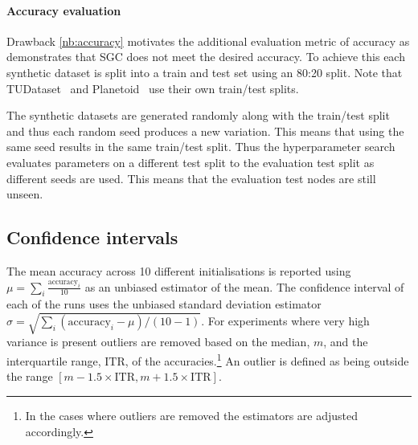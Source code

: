 
\paragraph{Accuracy evaluation}
Drawback \ref{nb:accuracy} motivates the additional evaluation metric of accuracy as  demonstrates that SGC does not meet the desired accuracy.
To achieve this each synthetic dataset is split into a train and test set using an 80:20 split.
Note that TUDataset~\cite{Morris+2020} and Planetoid~\cite{kipf2016semi} use their own train/test splits.

The synthetic datasets are generated randomly along with the train/test split and thus each random seed produces a new variation.
This means that using the same seed results in the same train/test split.
Thus the hyperparameter search evaluates parameters on a different test split to the evaluation test split as different seeds are used.
This means that the evaluation test nodes are still unseen.

\subsection{Confidence intervals}
\label{sec:reporting}
The mean accuracy across 10 different initialisations is reported using $\mu = \sum_i\frac{\text{accuracy}_i}{10}$ as an unbiased estimator of the mean.
The confidence interval of each of the runs uses the unbiased standard deviation estimator $\sigma = \sqrt{\sum_i(\text{accuracy}_i - \mu)/(10 - 1)}$.
For experiments where very high variance is present outliers are removed based on the median, $m$, and the interquartile range, $\text{ITR}$, of the accuracies.\footnote{In the cases where outliers are removed the estimators are adjusted accordingly.}
An outlier is defined as being outside the range $[m - 1.5 \times \text{ITR}, m + 1.5 \times \text{ITR}]$.


